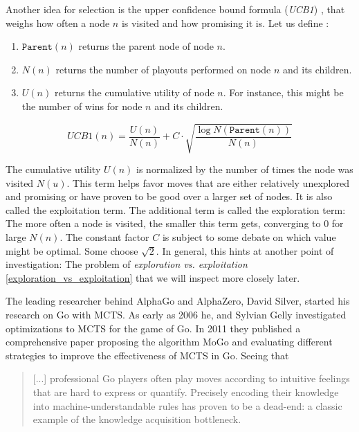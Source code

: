Another idea for selection is the upper confidence bound formula (\textit{UCB1}) \cite{auer_finite-time_nodate}, that weighs how often a node $n$ is visited and how promising it is. Let us define \cite[cf. p. 328]{russell_artificial_2021}:

\begin{enumerate}
    \item $\texttt{Parent}(n)$ returns the parent node of node $n$.
    \item $N(n) $ returns the number of playouts performed on node $n$ and its children.
    \item $U(n) $ returns the cumulative utility of node $n$. For instance, this might be the number of wins for node $n$ and its children.
\end{enumerate}

\begin{equation}
    \textit{UCB1}(n) = \frac{U(n)}{N(n)} + C \cdot \sqrt{\frac{\log{N(\texttt{Parent}(n))}}{N(n)}}
    \label{eq:UCB1}
\end{equation}

The cumulative utility $U(n)$ is normalized by the number of times the node was visited $N(u)$. This term helps favor moves that are either relatively unexplored and promising or have proven to be good over a larger set of nodes. It is also called the exploitation term. The additional term is called the exploration term: The more often a node is visited, the smaller this term gets, converging to $0$ for large $N(n)$. The constant factor $C$ is subject to some debate on which value might be optimal. Some choose $\sqrt{2}$. In general, this hints at another point of investigation: The problem of \textit{exploration vs. exploitation} \ref{exploration_vs_exploitation} that we will inspect more closely later.

The leading researcher behind AlphaGo and AlphaZero, David Silver, started his research on Go with MCTS. As early as 2006 he, and Sylvian Gelly investigated optimizations to MCTS \cite{gelly_achieving_nodate} for the game of Go. In 2011 they published a comprehensive paper \cite{gelly_monte-carlo_2011} proposing the algorithm MoGo and evaluating different strategies to improve the effectiveness of MCTS in Go. Seeing that

\begin{quotation}
    [...] professional Go players often play moves according to intuitive feelings that are hard to express or quantify. Precisely encoding their knowledge into machine-understandable rules has proven to be a dead-end: a classic example of the knowledge acquisition bottleneck. \cite[p. 1873]{gelly_monte-carlo_2011}
\end{quotation}

